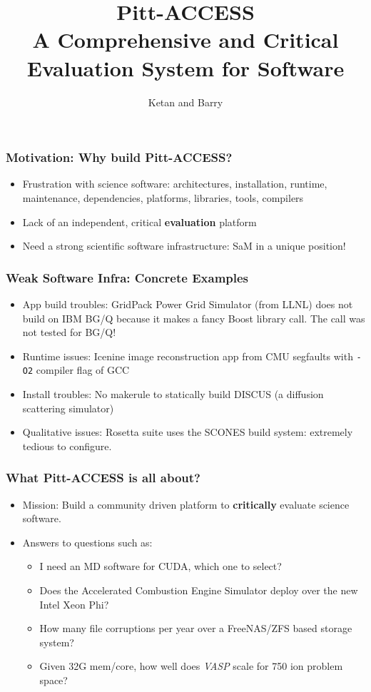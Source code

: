 \documentclass[hyperref={pdfpagelabels=false},12pt]{beamer}
\title[Pitt Access]{{\large Pitt-ACCESS\\ A Comprehensive and Critical Evaluation System for Software}}
\author[Pitt-Access]{{Ketan and Barry}}
\date{}
\begin{document}
\begin{frame}[plain]
\titlepage
\end{frame}

\begin{frame}
\frametitle{Motivation: Why build Pitt-ACCESS?}
\begin{itemize}
\itemsep1em
\item 
Frustration with science software: architectures, installation, runtime, maintenance, dependencies, platforms, libraries, tools, compilers
\item 
Lack of an independent, critical \textbf{evaluation} platform
\item 
Need a strong scientific software infrastructure: SaM in a unique position!
\end{itemize}
\end{frame}

\begin{frame}
\frametitle{Weak Software Infra: Concrete Examples}
\begin{itemize}
\itemsep1em
\item App build troubles: GridPack Power Grid Simulator (from LLNL) does not build on IBM BG/Q because it makes a fancy Boost library call. The call was not tested for BG/Q!
\item Runtime issues: Icenine image reconstruction app from CMU segfaults with \texttt{-O2} compiler flag of GCC
\item Install troubles: No makerule to statically build DISCUS (a diffusion scattering simulator)
\item Qualitative issues: Rosetta suite uses the SCONES build system: extremely tedious to configure.
\end{itemize}
\end{frame}

\begin{frame}
\frametitle{What Pitt-ACCESS is all about?}
\begin{itemize}
\itemsep1em
\item 
Mission: Build a community driven platform to \textbf{critically} evaluate science software.
\item 
Answers to questions such as:
\begin{itemize}
\item 
I need an MD software for CUDA, which one to select?
\item 
Does the Accelerated Combustion Engine Simulator deploy over the new Intel Xeon Phi?
\item
How many file corruptions per year over a FreeNAS/ZFS based storage system?
\item 
Given 32G mem/core, how well does \textit{VASP} scale for 750 ion problem space?
\end{itemize}
\end{itemize}

\end{frame}
\end{document}
